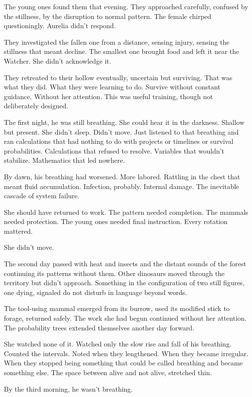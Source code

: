 The young ones found them that evening. They approached carefully, confused by the stillness, by the disruption to normal pattern. The female chirped questioningly. Aurelia didn't respond.

They investigated the fallen one from a distance, sensing injury, sensing the stillness that meant decline. The smallest one brought food and left it near the Watcher. She didn't acknowledge it.

They retreated to their hollow eventually, uncertain but surviving. That was what they did. What they were learning to do. Survive without constant guidance. Without her attention. This was useful training, though not deliberately designed.

The first night, he was still breathing. She could hear it in the darkness. Shallow but present. She didn't sleep. Didn't move. Just listened to that breathing and ran calculations that had nothing to do with projects or timelines or survival probabilities. Calculations that refused to resolve. Variables that wouldn't stabilize. Mathematics that led nowhere.

By dawn, his breathing had worsened. More labored. Rattling in the chest that meant fluid accumulation. Infection, probably. Internal damage. The inevitable cascade of system failure.

She should have returned to work. The pattern needed completion. The mammals needed protection. The young ones needed final instruction. Every rotation mattered.

She didn't move.

The second day passed with heat and insects and the distant sounds of the forest continuing its patterns without them. Other dinosaurs moved through the territory but didn't approach. Something in the configuration of two still figures, one dying, signaled do not disturb in language beyond words.

The tool-using mammal emerged from its burrow, used its modified stick to forage, returned safely. The work she had begun continued without her attention. The probability trees extended themselves another day forward.

She watched none of it. Watched only the slow rise and fall of his breathing. Counted the intervals. Noted when they lengthened. When they became irregular. When they stopped being something that could be called breathing and became something else. The space between alive and not alive, stretched thin.

By the third morning, he wasn't breathing.

